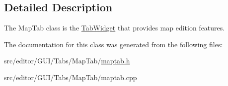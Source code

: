 \subsection{\-Detailed \-Description}
\-The \-Map\-Tab class is the \hyperlink{class_tab_widget}{\-Tab\-Widget} that provides map edition features. 

\-The documentation for this class was generated from the following files\-:\begin{DoxyCompactItemize}
\item 
src/editor/\-G\-U\-I/\-Tabs/\-Map\-Tab/\hyperlink{maptab_8h}{maptab.\-h}\item 
src/editor/\-G\-U\-I/\-Tabs/\-Map\-Tab/maptab.\-cpp\end{DoxyCompactItemize}
